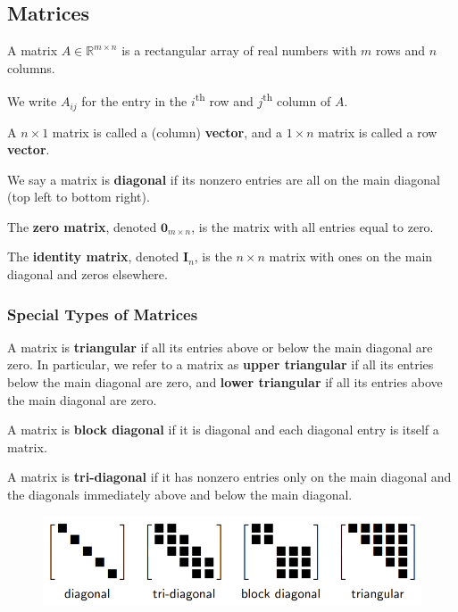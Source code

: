 \documentclass[11pt]{article}
\begin{document}
\subsection{Matrices} 
A matrix $A \in \mathbb{R}^{m\times n}$ is a rectangular array of real numbers with $m$ rows and $n$ columns. \par
We write $A_{ij}$ for the entry in the $i$\textsuperscript{th} row and $j$\textsuperscript{th} column of $A$. \par
A $n \times 1$ matrix is called a (column) \textbf{vector}, and a $1 \times n$ matrix is called a row \textbf{vector}. \par 

We say a matrix is \textbf{diagonal} if its nonzero entries are all on the main diagonal (top left to bottom right). \par
The \textbf{zero matrix}, denoted $\bm{0}_{m\times n}$, is the matrix with all entries equal to zero. \par
The \textbf{identity matrix}, denoted $\bm{I}_n$, is the $n \times n$ matrix with ones on the main diagonal and zeros elsewhere. \par

\subsubsection*{Special Types of Matrices}
A matrix is \textbf{triangular} if all its entries above or below the main diagonal are zero. In particular, we refer to a matrix as \textbf{upper triangular} if all its entries below the main diagonal are zero, and \textbf{lower triangular} if all its entries above the main diagonal are zero. \par
A matrix is \textbf{block diagonal} if it is diagonal and each diagonal entry is itself a matrix. \par
A matrix is \textbf{tri-diagonal} if it has nonzero entries only on the main diagonal and the diagonals immediately above and below the main diagonal. \par

\begin{figure}[H]
    \centering
    \includegraphics[width=.6\textwidth]{images/1.1}
\end{figure}
\end{document}
